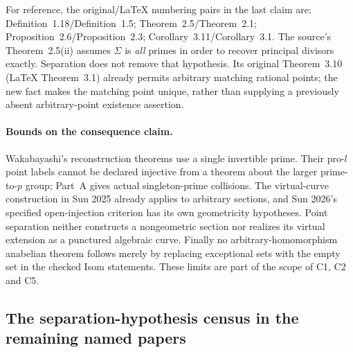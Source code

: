 \documentclass[11pt,a4paper]{article}
\begin{document}
For reference, the original/LaTeX numbering pairs in the last
claim are: Definition~1.18/Definition~1.5;
Theorem~2.5/Theorem~2.1; Proposition~2.6/Proposition~2.3;
Corollary~3.11/Corollary~3.1. The source's
Theorem~2.5(ii) assumes $\Sigma$ is \emph{all} primes in order
to recover principal divisors exactly. Separation does not remove
that hypothesis. Its original Theorem~3.10 (LaTeX Theorem~3.1)
already permits arbitrary matching rational points; the new
fact makes the matching point unique, rather than supplying a
previously absent arbitrary-point existence assertion.

\paragraph{Bounds on the consequence claim.}
Wakabayashi's reconstruction theorems use a single invertible
prime. Their pro-$l$ point labels cannot be declared injective
from a theorem about the larger prime-to-$p$ group; Part~A gives
actual singleton-prime collisions. The virtual-curve construction
in Sun 2025 already applies to arbitrary sections, and Sun 2026's
specified open-injection criterion has its own geometricity
hypotheses. Point separation neither constructs a nongeometric
section nor realizes its virtual extension as a punctured
algebraic curve. Finally no arbitrary-homomorphism anabelian
theorem follows merely by replacing exceptional sets with the
empty set in the checked Isom statements. These limits are part
of the scope of C1, C2 and C5.

\subsection{The separation-hypothesis census in the remaining named papers}
\end{document}
